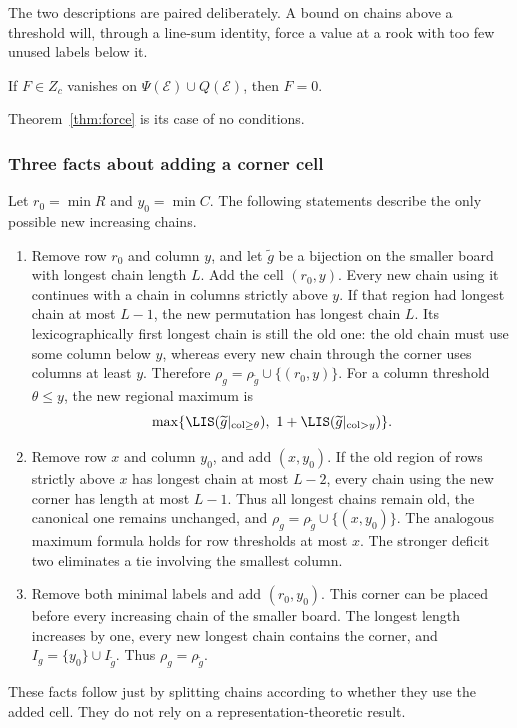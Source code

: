 The two descriptions are paired deliberately. A bound on chains above a threshold will, through a line-sum identity, force a value at a rook with too few unused labels below it.

\begin{lemma}\label{lem:GP}
If $F\in Z_c$ vanishes on $\Psi(\mathcal E)\cup Q(\mathcal E)$, then $F=0$.
\end{lemma}
Theorem~\ref{thm:force} is its case of no conditions.

\subsubsection{Three facts about adding a corner cell}
Let $r_0=\min R$ and $y_0=\min C$. The following statements describe the only possible new increasing chains.
\begin{enumerate}
\item Remove row $r_0$ and column $y$, and let $\widetilde g$ be a bijection on the smaller board with longest chain length $L$. Add the cell $(r_0,y)$. Every new chain using it continues with a chain in columns strictly above $y$. If that region had longest chain at most $L-1$, the new permutation has longest chain $L$. Its lexicographically first longest chain is still the old one: the old chain must use some column below $y$, whereas every new chain through the corner uses columns at least $y$. Therefore $\rho_g=\rho_{\widetilde g}\cup\{(r_0,y)\}$. For a column threshold $\theta\le y$, the new regional maximum is
\[\max\{\LIS(\widetilde g|_{\mathrm{col}\ge\theta}),\ 1+\LIS(\widetilde g|_{\mathrm{col}>y})\}.
\]
\item Remove row $x$ and column $y_0$, and add $(x,y_0)$. If the old region of rows strictly above $x$ has longest chain at most $L-2$, every chain using the new corner has length at most $L-1$. Thus all longest chains remain old, the canonical one remains unchanged, and $\rho_g=\rho_{\widetilde g}\cup\{(x,y_0)\}$. The analogous maximum formula holds for row thresholds at most $x$. The stronger deficit two eliminates a tie involving the smallest column.
\item Remove both minimal labels and add $(r_0,y_0)$. This corner can be placed before every increasing chain of the smaller board. The longest length increases by one, every new longest chain contains the corner, and $I_g=\{y_0\}\cup I_{\widetilde g}$. Thus $\rho_g=\rho_{\widetilde g}$.
\end{enumerate}
These facts follow just by splitting chains according to whether they use the added cell. They do not rely on a representation-theoretic result.


